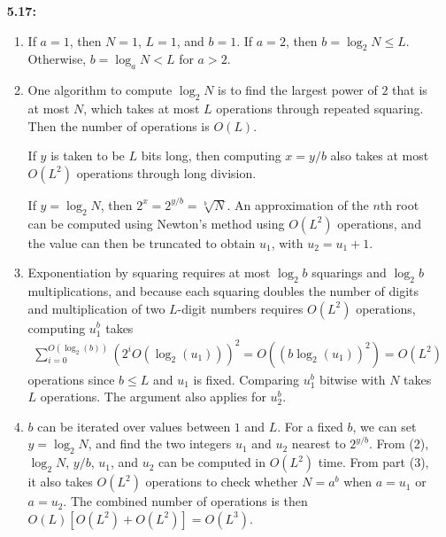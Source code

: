 \documentclass[a4paper,12pt]{article}
\begin{document}
\begin{enumerate}
    \item[\textbf{5.17:}]
       \begin{enumerate}[label=(\arabic*)]
            \item
                If $a = 1$, then $N = 1$, $L = 1$, and $b = 1$. If $a = 2$, then $b = \log_2 N \leq L$. Otherwise, $b = \log_a N < L$ for $a > 2$.

            \item
                One algorithm to compute $\log_2 N$ is to find the largest power of $2$ that is at most $N$, which takes at most $L$ operations through repeated squaring. Then the number of operations is $O(L)$. \par
                If $y$ is taken to be $L$ bits long, then computing $x = y / b$ also takes at most $O(L^2)$ operations through long division. \par
                If $y = \log_2 N$, then $2^x = 2^{y / b} = \sqrt[b]{N}$. An approximation of the $n$th root can be computed using Newton's method using $O(L^2)$ operations, and the value can then be truncated to obtain $u_1$, with $u_2 = u_1 + 1$.

            \item
                Exponentiation by squaring requires at most $\log_2 b$ squarings and $\log_2 b$ multiplications, and because each squaring doubles the number of digits and multiplication of two $L$-digit numbers requires $O(L^2)$ operations, computing $u_1^b$ takes
                \begin{align*}
                    \sum_{i = 0}^{O(\log_2(b))} (2^i O(\log_2(u_1)))^2 = O((b \log_2(u_1))^2) = O(L^2)
                \end{align*}
                operations since $b \leq L$ and $u_1$ is fixed. Comparing $u_1^b$ bitwise with $N$ takes $L$ operations. The argument also applies for $u_2^b$.
                \iffalse
                Because $b \leq N$ and any integer at most $N$ can be written as $2^0 c_0 + 2^1 c_1 + \cdots + 2^{L - 1} c_{L - 1}$, where $c_i \in \{0, 1\}$ for all $i$, $u_1^b$ and $u_2^b$ can be computed as products of powers of $2$. The product has $L$ factors and the power of $2$ in each factor takes at most $L$ operations to calculate, so the total complexity is $O(L^2)$.
                \fi

            \item
                $b$ can be iterated over values between $1$ and $L$. For a fixed $b$, we can set $y = \log_2 N$, and find the two integers $u_1$ and $u_2$ nearest to $2^{y / b}$. From (2), $\log_2 N$, $y / b$, $u_1$, and $u_2$ can be computed in $O(L^2)$ time. From part (3), it also takes $O(L^2)$ operations to check whether $N = a^b$ when $a = u_1$ or $a = u_2$. The combined number of operations is then $O(L) [O(L^2) + O(L^2)] = O(L^3)$.
        \end{enumerate}

\end{enumerate}
\end{document}
